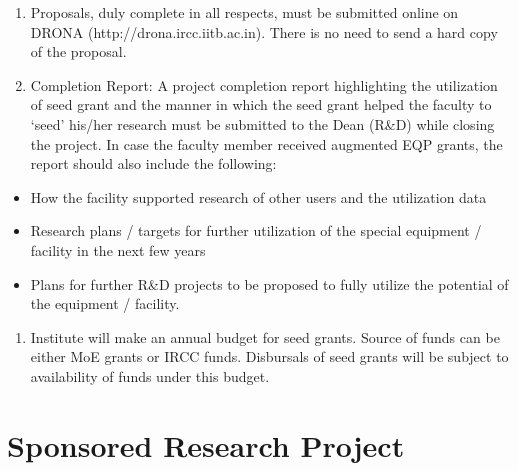 \documentclass[
  10pt,
  a5paper,
  10pt,
  openany]{amsbook}
\providecommand{\tightlist}{%
  \setlength{\itemsep}{0pt}\setlength{\parskip}{0pt}}
\begin{document}
\begin{enumerate}
\begin{enumerate}
    \begin{itemize}
    \tightlist
    \item
      Supplement any shortfall in the equipment grant from external
      agencies
    \item
      Enhance capability of the equipment / facility proposed in the
      project
    \item
      Support additional accessories to the equipment funded by external
      agencies
    \end{itemize}
  \end{enumerate}
\item
  Proposals, duly complete in all respects, must be submitted online on
  DRONA (http://drona.ircc.iitb.ac.in). There is no need to send a hard
  copy of the proposal.
\item
  Completion Report: A project completion report highlighting the
  utilization of seed grant and the manner in which the seed grant
  helped the faculty to `seed' his/her research must be submitted to the
  Dean (R\&D) while closing the project. In case the faculty member
  received augmented EQP grants, the report should also include the
  following:
\end{enumerate}

\begin{itemize}
\tightlist
\item
  How the facility supported research of other users and the utilization
  data
\item
  Research plans / targets for further utilization of the special
  equipment / facility in the next few years
\item
  Plans for further R\&D projects to be proposed to fully utilize the
  potential of the equipment / facility.
\end{itemize}

\begin{enumerate}
\def\labelenumi{\arabic{enumi}.}
\setcounter{enumi}{9}
\tightlist
\item
  Institute will make an annual budget for seed grants. Source of funds
  can be either MoE grants or IRCC funds. Disbursals of seed grants will
  be subject to availability of funds under this budget.
\end{enumerate}

\section{Sponsored Research Project}\label{sponsored-research-project}
\end{document}
